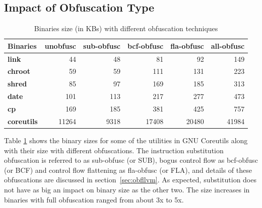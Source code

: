 \subsection{Impact of Obfuscation Type}

\begin{table} [h]
    \centering
    \begin{adjustbox}{max width=\linewidth}
    \begin{tabular}{|l|r|r|r|r|r|}
        \hline
        \bf Binaries & \bf unobfusc & \bf sub-obfusc & \bf bcf-obfusc & \bf fla-obfusc & \bf all-obfusc \\
        \hline
        \bf link & 44 & 48 & 81 & 92 & 149 \\
        \bf chroot & 59 & 59 & 111 & 131 & 223 \\
        \bf shred & 85 & 97 & 169 & 185 & 313 \\
        \bf date & 101 & 113 & 217 & 277 & 473 \\
        \bf cp & 169 & 185 & 381 & 425 & 757 \\
        \bf coreutils & 11264 & 9318 & 17408 & 20480 & 41984 \\
        \hline
    \end{tabular}
    \end{adjustbox}
    \captionsetup{font=footnotesize, labelfont=bf, justification=centering}
    \caption{Binaries size (in KBs) with different obfuscation techniques}
    \label{tab:binsize}
\end{table}

Table \ref{tab:binsize} shows the binary sizes for some of the utilities 
in GNU Coreutils along with their size with different obfuscations. The 
instruction substitution obfuscation is referred to as sub-obfusc (or 
SUB), bogus control flow as bcf-obfusc (or BCF) and control flow 
flattening as fla-obfusc (or FLA), and details of these obfuscations are 
discussed in section~\ref{sec:obfllvm}. As expected, substitution does not 
have as big an impact on binary size as the other two. The size increases 
in binaries with full obfuscation ranged from about 3x to 5x. 

